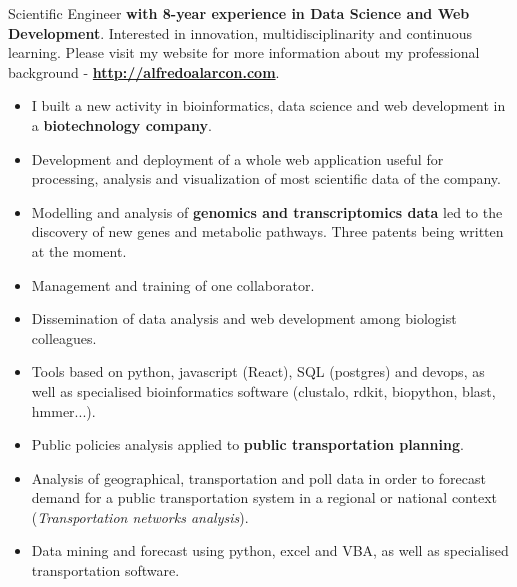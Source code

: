 \documentclass[9pt,a4paper]{altacv}%
\begin{document}
\small{Scientific Engineer \textbf{with 8-year experience in Data Science and  Web Development}. Interested in innovation, multidisciplinarity and continuous learning.
Please visit my website for more information about my professional background - \textbf{\href{http://alfredoalarcon.com}{http://alfredoalarcon.com}}.


\begin{itemize}
  \item I built a new activity in bioinformatics, data science and web development in a \textbf{biotechnology company}.
  \item Development and deployment of a whole web application useful for processing, analysis and visualization of most scientific data of the company.
  \item Modelling and analysis of \textbf{genomics and transcriptomics data} led to the discovery of new genes and metabolic pathways. Three patents being written at the moment.
  \item Management and training of one collaborator.
  \item Dissemination of data analysis and web development among biologist colleagues.
  \item Tools based on python, javascript (React), SQL (postgres) and devops, as well as specialised bioinformatics software (clustalo, rdkit, biopython, blast, hmmer...).
\end{itemize}

\divider

\begin{itemize}
  \item Public policies analysis applied to \textbf{public transportation planning}.
  \item Analysis of geographical, transportation and poll data in order to forecast demand for a public transportation system in a regional or national context (\textit{Transportation networks analysis}).
  \item Data mining and forecast using python, excel and VBA, as well as specialised transportation software.
\end{itemize}

\divider


}
\end{document}
